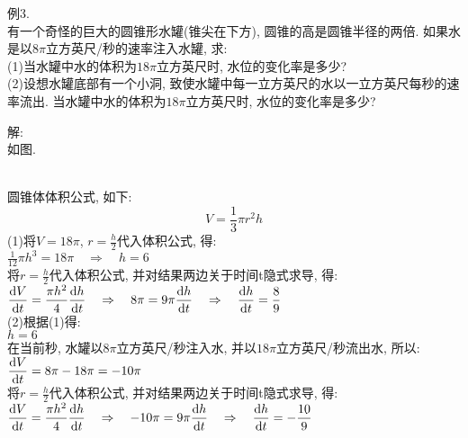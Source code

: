 例3.\\
有一个奇怪的巨大的圆锥形水罐(锥尖在下方), 圆锥的高是圆锥半径的两倍. 如果水是以$8\pi$立方英尺/秒的速率注入水罐, 求:\\
(1)当水罐中水的体积为$18\pi$立方英尺时, 水位的变化率是多少?\\
(2)设想水罐底部有一个小洞, 致使水罐中每一立方英尺的水以一立方英尺每秒的速率流出. 当水罐中水的体积为$18\pi$立方英尺时, 水位的变化率是多少?

解:\\
如图.\\
\\
圆锥体体积公式, 如下:
\[V=\frac{1}{3}\pi r^2h\]
(1)将$V=18\pi$, $r=\frac{h}{2}$代入体积公式, 得:\\[1ex]
\phantom{(1)}$\displaystyle\frac{1}{12}\pi h^3=18\pi\quad\Rightarrow\quad h=6$\\[1ex]
\phantom{(1)}将$r=\frac{h}{2}$代入体积公式, 并对结果两边关于时间t隐式求导, 得:\\[1ex]
\phantom{(1)}$\displaystyle\frac{\dif V}{\dif t}=\frac{\pi h^2}{4}\frac{\dif h}{\dif t}\quad\Rightarrow\quad 8\pi=9\pi\frac{\dif h}{\dif t}\quad\Rightarrow\quad\frac{\dif h}{\dif t}=\frac{8}{9}$\\[1ex]
(2)根据(1)得:\\
\phantom{(2)}$h=6$\\
\phantom{(2)}在当前秒, 水罐以$8\pi$立方英尺/秒注入水, 并以$18\pi$立方英尺/秒流出水, 所以:\\[1ex]
\phantom{(2)}$\displaystyle\frac{\mathop{}\!\mathrm{d} V}{\mathop{}\!\mathrm{d} t}=8\pi-18\pi=-10\pi$\\[1ex]
\phantom{(2)}将$r=\frac{h}{2}$代入体积公式, 并对结果两边关于时间t隐式求导, 得:\\[1ex]
\phantom{(2)}$\displaystyle\frac{\dif V}{\dif t}=\frac{\pi h^2}{4}\frac{\dif h}{\dif t}\quad\Rightarrow\quad -10\pi=9\pi\frac{\dif h}{\dif t}\quad\Rightarrow\quad\frac{\dif h}{\dif t}=-\frac{10}{9}$\\[2ex]

